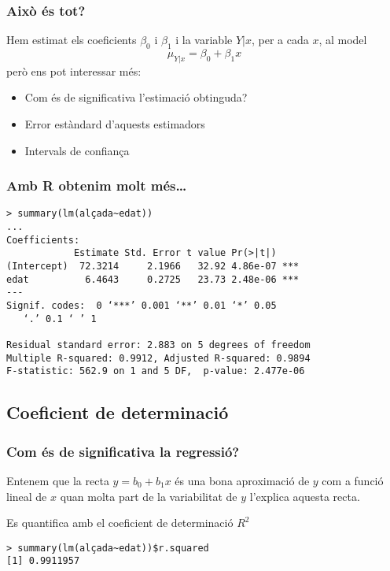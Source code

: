 \documentclass[12pt,t]{beamer}
\renewcommand{\emph}[1]{{\color{red}#1}}
\theoremstyle{plain}
\theoremstyle{definition}
\begin{document}
\begin{frame}
\frametitle{Això és tot?}
Hem estimat els coeficients $\beta_0$ i $\beta_1$ i la variable $Y|x$, per a cada $x$,  al model
$$
\mu_{Y|x}=\beta_0+\beta_1 x
$$
però ens pot interessar més:
\medskip

\begin{itemize}
\item Com és de significativa l'estimació obtinguda?
\medskip

\item Error estàndard d'aquests estimadors
\medskip

\item Intervals de confiança 
\end{itemize}
\end{frame}




\begin{frame}[fragile]
\frametitle{Amb R obtenim molt més\ldots}
\footnotesize \begin{verbatim}
> summary(lm(alçada~edat))
...
Coefficients:
            Estimate Std. Error t value Pr(>|t|)    
(Intercept)  72.3214     2.1966   32.92 4.86e-07 ***
edat          6.4643     0.2725   23.73 2.48e-06 ***
---
Signif. codes:  0 ‘***’ 0.001 ‘**’ 0.01 ‘*’ 0.05
   ‘.’ 0.1 ‘ ’ 1 

Residual standard error: 2.883 on 5 degrees of freedom
Multiple R-squared: 0.9912,	Adjusted R-squared: 0.9894 
F-statistic: 562.9 on 1 and 5 DF,  p-value: 2.477e-06 
\end{verbatim}
\end{frame}


\subsection{Coeficient de determinació}
\begin{frame}[fragile]
\frametitle{Com és de significativa la regressió?}

Entenem que la recta $\widehat{y}=b_0+b_1x$ és una bona aproximació de $y$ com a funció lineal de $x$ quan molta part de la variabilitat de $y$ l'explica aquesta recta.
\bigskip

Es quantifica amb el \emph{coeficient de determinació $R^2$}
\begin{verbatim}
> summary(lm(alçada~edat))$r.squared
[1] 0.9911957
\end{verbatim}

\end{frame}
\end{document}
